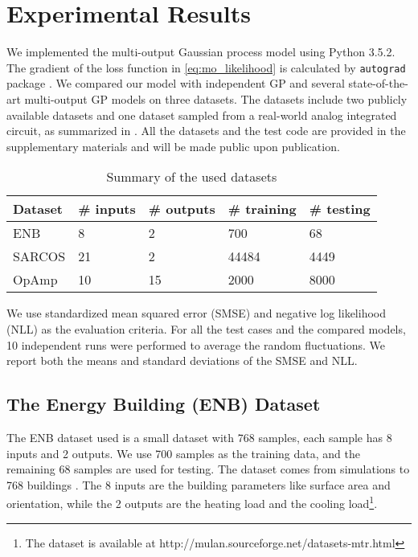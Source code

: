 \section{Experimental Results}\label{sec:experiments}


We implemented the multi-output Gaussian process model using Python 3.5.2. The gradient of the loss function in \eqref{eq:mo_likelihood} is calculated by \texttt{autograd} package \cite{maclaurin2015autograd}. We compared our model with independent GP and several state-of-the-art multi-output GP models on three datasets. The datasets include two publicly available datasets and one dataset sampled from a real-world analog integrated circuit, as summarized in . All the datasets and the test code are provided in the supplementary materials and will be made public upon publication.

\begin{table}[!htb]
    \centering
    \caption{Summary of the used datasets}
    \label{tab:datasets}
    \begin{tabular}{lllll}
        \toprule
        Dataset & \# inputs & \# outputs & \# training & \# testing \\ \midrule
        ENB    & 8         & 2          & 700         & 68  \\
        SARCOS & 21        & 2          & 44484       & 4449 \\
        OpAmp  & 10        & 15         & 2000        & 8000 \\
        \bottomrule
    \end{tabular}
\end{table}
We use standardized mean squared error (SMSE) and negative log likelihood (NLL) as the evaluation criteria. For all the test cases and the compared models, 10 independent runs were performed to average the random fluctuations. We report both the means and standard deviations of the SMSE and NLL.

\subsection{The Energy Building (ENB) Dataset}\label{sec:enb}

The ENB dataset used is a small dataset with 768 samples, each sample has 8 inputs and 2 outputs. We use 700 samples as the training data, and the remaining 68 samples are used for testing. The dataset comes from simulations to 768 buildings \cite{spyromitros2016multi, tsanas2012accurate}. The 8 inputs are the building parameters like surface area and orientation, while the 2 outputs are the heating load and the cooling load\footnote{The dataset is available at http://mulan.sourceforge.net/datasets-mtr.html}.


